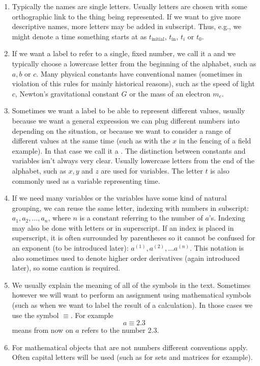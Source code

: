 \begin{enumerate}
\item Typically the names are single letters. Usually letters are chosen with some orthographic link to the thing being represented. If we want to give more descriptive names, more letters may be added in subscript. Thus, e.g., we might denote a time something starts at as $t_\text{initial}$, $t_\text{in}$, $t_i$ or $t_0$.

\item If we want a label to refer to a single, fixed number, we call it a  and we typically choose a lowercase letter from the beginning of the alphabet, such as $a, b$ or $c$. Many physical constants have conventional names (sometimes in violation of this rules for mainly historical reasons), such as the speed of light $c$, Newton's gravitational constant $G$ or the mass of an electron $m_e$.

\item Sometimes we want a label to be able to represent different values, usually because we want a general expression we can plug different numbers into depending on the situation, or because we want to consider a range of different values at the same time (such as with the $x$ in the fencing of a field example). In that case we call it a . The distinction between constants and variables isn't always very clear. Usually lowercase letters from the end of the alphabet, such as $x, y$ and $z$ are used for variables. The letter $t$ is also commonly used as a variable representing time.

\item If we need many variables or the variables have some kind of natural grouping, we can reuse the same letter, indexing with numbers in subscript: $a_1, a_2, \ldots, a_n$, where $n$ is a constant referring to the number of $a$'s. Indexing may also be done with letters or in superscript. If an index is placed in superscript, it is often surrounded by parentheses so it cannot be confused for an exponent (to be introduced later): $a^{(1)}, a^{(2)}, \ldots a^{(n)}$. This notation is also sometimes used to denote higher order derivatives (again introduced later), so some caution is required.

\item We usually explain the meaning of all of the symbols in the text. Sometimes however we will want to perform an assignment using mathematical symbols (such as when we want to label the result of a calculation). In those cases we use the symbol $\equiv$. For example
\[ a \equiv 2.3\]
means from now on $a$ refers to the number $2.3$.

\item For mathematical objects that are not numbers different conventions apply. Often capital letters will be used (such as for sets and matrices for example).
\end{enumerate}

